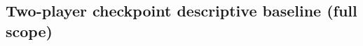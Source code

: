 \documentclass[sigconf]{aamas}
\newcommand{\Safe}{\textsc{safe}}
\newcommand{\Unsafe}{\textsc{unsafe}}
\begin{document}



\subsection{Two-player checkpoint descriptive baseline (full scope)}
\label{app:twoplayer-baseline}
\end{document}
